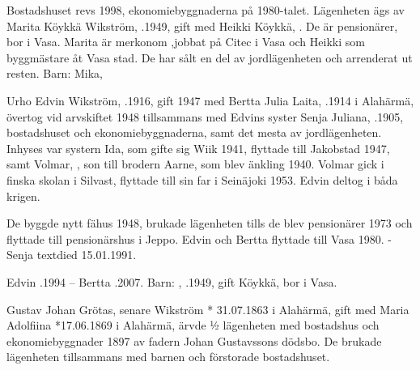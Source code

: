 
Bostadshuset revs 1998,  ekonomiebyggnaderna på 1980-talet. Lägenheten ägs av Marita Köykkä Wikström, .1949, gift med Heikki Köykkä, . De är pensionärer, bor i Vasa.  Marita är merkonom ,jobbat på Citec i Vasa och Heikki som byggmästare åt Vasa stad.  De har sålt en del av jordlägenheten och arrenderat ut resten.
Barn: Mika, 


Urho Edvin Wikström, .1916, gift 1947 med Bertta Julia Laita, .1914 i Alahärmä, övertog vid arvskiftet 1948 tillsammans med Edvins syster Senja Juliana, .1905, bostadshuset och ekonomiebyggnaderna, samt det mesta av jordlägenheten. Inhyses var systern Ida, som gifte sig Wiik 1941, flyttade till Jakobstad 1947, samt Volmar, ,  son till brodern Aarne, som blev änkling 1940. Volmar gick i finska skolan i Silvast, flyttade till sin far i Seinäjoki 1953.  Edvin deltog i båda krigen.

De byggde nytt fähus 1948, brukade lägenheten tills de blev pensionärer 1973 och flyttade till pensionärshus i Jeppo.  Edvin och Bertta flyttade till Vasa 1980. - Senja textdied 15.01.1991.

Edvin .1994  --  Bertta .2007.
Barn: , .1949, gift Köykkä, bor i Vasa.


Gustav Johan Grötas, senare Wikström * 31.07.1863 i Alahärmä, gift med Maria Adolfiina *17.06.1869 i Alahärmä, ärvde ½ lägenheten med bostadshus och ekonomiebyggnader 1897 av fadern Johan Gustavssons dödsbo. De brukade lägenheten  tillsammans med barnen och förstorade bostadshuset.

